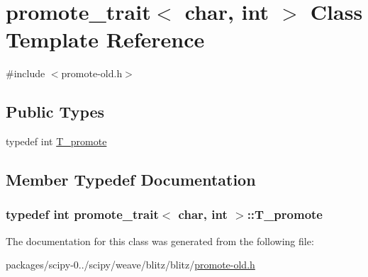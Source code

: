\hypertarget{classpromote__trait_3_01char_00_01int_01_4}{}\section{promote\+\_\+trait$<$ char, int $>$ Class Template Reference}
\label{classpromote__trait_3_01char_00_01int_01_4}


{\ttfamily \#include $<$promote-\/old.\+h$>$}

\subsection*{Public Types}
\begin{DoxyCompactItemize}
\item 
typedef int \hyperlink{classpromote__trait_3_01char_00_01int_01_4_a26d457719a0532fd7f23fa43d9bb36c7}{T\+\_\+promote}
\end{DoxyCompactItemize}


\subsection{Member Typedef Documentation}
\hypertarget{classpromote__trait_3_01char_00_01int_01_4_a26d457719a0532fd7f23fa43d9bb36c7}{}
\subsubsection[{T\+\_\+promote}]{\setlength{\rightskip}{0pt plus 5cm}typedef int {\bf promote\+\_\+trait}$<$ char, int $>$\+::{\bf T\+\_\+promote}}\label{classpromote__trait_3_01char_00_01int_01_4_a26d457719a0532fd7f23fa43d9bb36c7}


The documentation for this class was generated from the following file\+:\begin{DoxyCompactItemize}
\item 
packages/scipy-\/0../scipy/weave/blitz/blitz/\hyperlink{promote-old_8h}{promote-\/old.\+h}\end{DoxyCompactItemize}
